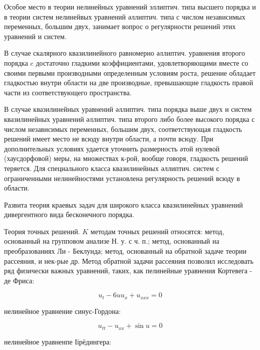 \documentclass[10pt]{article}
\begin{document}
Особое место в теории нелинейных уравнений эллиптич. типа высшего порядка и в теории систем нелинейвых уравнений әллиптич. типа с числом независимых переменных, большим двух, занимает вопрос о регулярности решений этих уравнений и систем.



В случае скалярного квазилинейного равномерно әллиптич. уравнения второго порядка $\mathrm{c}$ достаточно гладкими коэффициентами, удовлетворяющими вместе со своими первыми производными определенным условиям роста, решение обладает гладкостью внутри области на две производные, превышающие гладкость правой части из соответствующего пространства.



В случае квазилинейных уравнений әллиптич. типа порядка выше двух и систем квазилинейных уравнений әллиптич. типа второго либо более высокого порядка с числом независимых переменных, большим двух, соответствующая гладкость решений имеет место не всюду внутри области, а почти всюду. При дополнительных условиях удается уточнить размерность әтой нулевой (хаусдорфовой) меры, на множествах к-рой, вообще говоря, гладкость решений теряется. Для специального класса квазилинейных әллиптич. систем с ограниченными нелинейностями установлена регулярность решений всюду в области.



Развита теория краевых задач для широкого класса квазилинейных уравнений дивергентного вида бесконечного порядка.



Теория точных решений. $K$ методам точных решений относятся: метод, основанный на групповом анализе Н. у. с ч. п.; метод, основанный на преобразованиях Ли - Беклунда; метод, основанный на обратной задаче теории рассеяния, и нек-рые др. Метод обратной задачи рассеяния позволил исследовать ряд физически важных уравнений, таких, как пелинейные уравнения Кортевега - де Фриса:



\[

u_{t}-6 u u_{x}+u_{x x x}=0

\]



нелинейное уравнение синус-Гордона:



\[

u_{t t}-u_{x x}+\sin u=0

\]



нелинейное уравненпе Іірёдингера:
\end{document}
